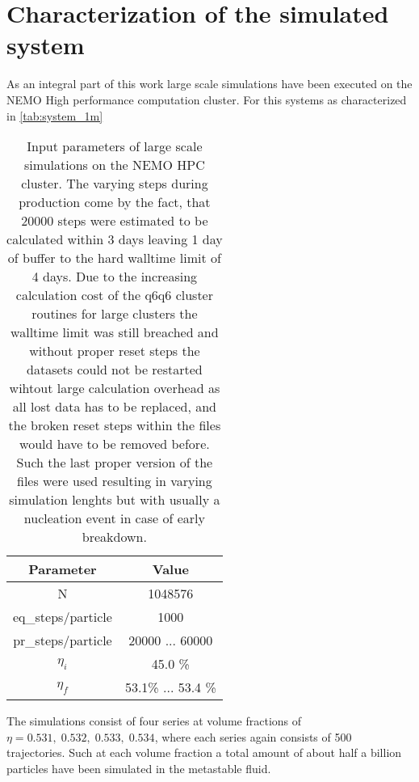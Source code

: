 
\label{chp:data_analysis}
\section{Characterization of the simulated system}
\label{sec:system_choice}
As an integral part of this work large scale simulations have been executed on the NEMO High performance computation cluster. For this systems as characterized in \autoref{tab:system_1m}

\begin{table}[h]
\centering
\begin{tabular}{c|c}
Parameter & Value \\ \hline
N & 1048576 \\
eq\_steps/particle & 1000 \\
pr\_steps/particle & 20000  ... 60000 \\
$\eta_i$ & 45.0 \% \\
$\eta_f$ & 53.1\% ... 53.4 \% \\
\end{tabular}
\caption{Input parameters of large scale simulations on the NEMO HPC cluster. The varying steps during production come by the fact, that 20000 steps were estimated to be calculated within 3 days leaving 1 day of buffer to the hard walltime limit of 4 days. Due to the increasing calculation cost of the q6q6 cluster routines for large clusters the walltime limit was still breached and without proper reset steps the datasets could not be restarted wihtout large calculation overhead as all lost data has to be replaced, and the broken reset steps within the files would have to be removed before. Such the last proper version of the files were used resulting in varying simulation lenghts but with usually a nucleation event in case of early breakdown.}
\label{tab:system_1m}
\end{table}

The simulations consist of four series at volume fractions of $\eta = 0.531,\;0.532,\;0.533,\;0.534$, where each series again consists of 500 trajectories. Such at each volume fraction a total amount of about half a billion particles have been simulated in the metastable fluid.\\

